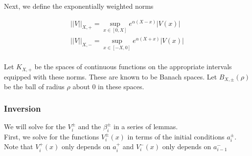 \documentclass[12pt]{article}
\begin{document}
Next, we define the exponentially weighted norms

\begin{align*}
||V||_{X, +} = \sup_{x \in [0, X]} e^{\alpha(X - x)}|V(x)| \\
||V||_{X, -} = \sup_{x \in [-X, 0]} e^{\alpha(X + x)}|V(x)| \\
\end{align*}

Let $K_{X, +}$ be the spaces of continuous functions on the appropriate intervals equipped with these norms. These are known to be Banach spaces. Let $B_{X, \pm}(\rho)$ be the ball of radius $\rho$ about $0$ in these spaces.\\

\subsubsection{Inversion}

We will solve for the $V_i^\pm$ and the $\beta_i^\pm$ in a series of lemmas.\\

First, we solve for the functions $V_i^\pm(x)$ in terms of the initial conditions $a_i^\pm$. Note that $V_i^+(x)$ only depends on $a_i^+$ and $V_i^-(x)$ only depends on $a_{i-1}^-$

\end{document}
